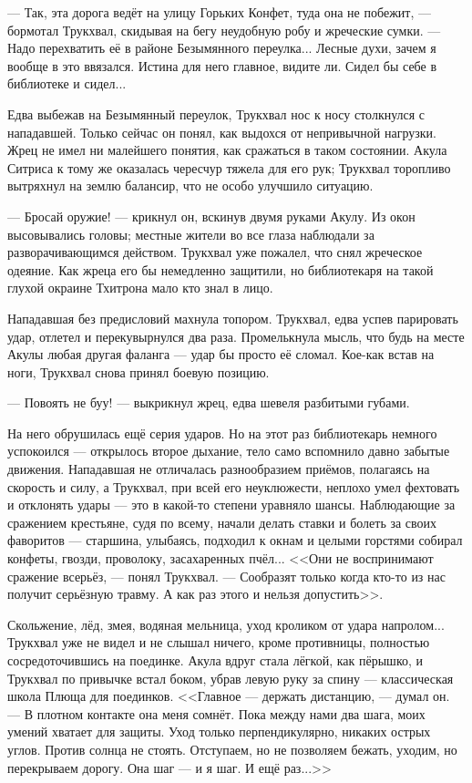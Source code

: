 \documentclass[a4paper,10pt,fleqn]{book}\usepackage{cooltooltips}\usepackage{polyglossia}\setdefaultlanguage{english}\setotherlanguage{russian}\defaultfontfeatures{Ligatures=TeX,Mapping=tex-text} \usepackage{xcolor}\definecolor{lightgray}{HTML}{bbbbbb}\color{lightgray}\newcommand{\ml}[3]{\textcolor{black}{#3}}
\begin{document}
--- Так, эта дорога ведёт на улицу Горьких Конфет, туда она не побежит, --- бормотал Трукхвал, скидывая на бегу неудобную робу и жреческие сумки.
--- Надо перехватить её в районе Безымянного переулка...
Лесные духи, зачем я вообще в это ввязался.
Истина для него главное, видите ли.
Сидел бы себе в библиотеке и сидел...

Едва выбежав на Безымянный переулок, Трукхвал нос к носу столкнулся с нападавшей.
Только сейчас он понял, как выдохся от непривычной нагрузки.
Жрец не имел ни малейшего понятия, как сражаться в таком состоянии.
Акула Ситриса к тому же оказалась чересчур тяжела для его рук;
Трукхвал торопливо вытряхнул на землю балансир, что не особо улучшило ситуацию.

--- Бросай оружие! --- крикнул он, вскинув двумя руками Акулу.
Из окон высовывались головы;
местные жители во все глаза наблюдали за разворачивающимся действом.
Трукхвал уже пожалел, что снял жреческое одеяние.
Как жреца его бы немедленно защитили, но библиотекаря на такой глухой окраине Тхитрона мало кто знал в лицо.

Нападавшая без предисловий махнула топором.
Трукхвал, едва успев парировать удар, отлетел и перекувырнулся два раза.
Промелькнула мысль, что будь на месте Акулы любая другая фаланга --- удар бы просто её сломал.
Кое-как встав на ноги, Трукхвал снова принял боевую позицию.

--- Повоять не буу! --- выкрикнул жрец, едва шевеля разбитыми губами.

На него обрушилась ещё серия ударов.
Но на этот раз библиотекарь немного успокоился --- открылось второе дыхание, тело само вспомнило давно забытые движения.
Нападавшая не отличалась разнообразием приёмов, полагаясь на скорость и силу, а Трукхвал, при всей его неуклюжести, неплохо умел фехтовать и отклонять удары --- это в какой-то степени уравняло шансы.
Наблюдающие за сражением крестьяне, судя по всему, начали делать ставки и болеть за своих фаворитов --- старшина, улыбаясь, подходил к окнам и целыми горстями собирал конфеты, гвозди, проволоку, засахаренных пчёл...
<<Они не воспринимают сражение всерьёз, --- понял Трукхвал.
--- Сообразят только когда кто-то из нас получит серьёзную травму.
А как раз этого и нельзя допустить>>.

Скольжение, лёд, змея, водяная мельница, уход кроликом от удара напролом...
Трукхвал уже не видел и не слышал ничего, кроме противницы, полностью сосредоточившись на поединке.
Акула вдруг стала лёгкой, как пёрышко, и Трукхвал по привычке встал боком, убрав левую руку за спину --- классическая школа Плюща для поединков.
<<Главное --- держать дистанцию, --- думал он.
--- В плотном контакте она меня сомнёт.
Пока между нами два шага, моих умений хватает для защиты.
Уход только перпендикулярно, никаких острых углов.
Против солнца не стоять.
Отступаем, но не позволяем бежать, уходим, но перекрываем дорогу.
Она шаг --- и я шаг.
И ещё раз...>>
\end{document}
